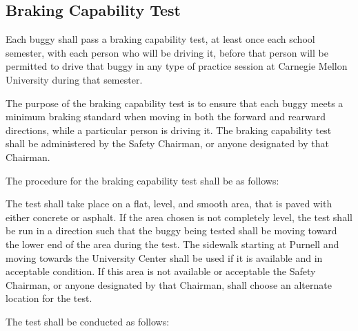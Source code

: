\subsection{Braking Capability Test}

	Each buggy shall pass a braking capability test, at least once each school
	semester, with each person who will be driving it, before that person will be
	permitted to drive that buggy in any type of practice session at Carnegie
	Mellon University during that semester.

	The purpose of the braking capability test is to ensure that each buggy meets a
	minimum braking standard when moving in both the forward and rearward
	directions, while a particular person is driving it. The braking capability
	test shall be administered by the Safety Chairman, or anyone designated by that
	Chairman.
	\newline

	\noindent The procedure for the braking capability test shall be as follows:

	The test shall take place on a flat, level, and smooth area, that is paved with
	either concrete or asphalt. If the area chosen is not completely level, the
	test shall be run in a direction such that the buggy being tested shall be
	moving toward the lower end of the area during the test. The sidewalk starting at
	Purnell and moving towards the University Center shall be used if it is available
	and in acceptable condition. If this area is not available or acceptable the
	Safety Chairman, or anyone designated by that Chairman, shall choose an alternate
	location for the test.
	\newline

	\noindent The test shall be conducted as follows:


